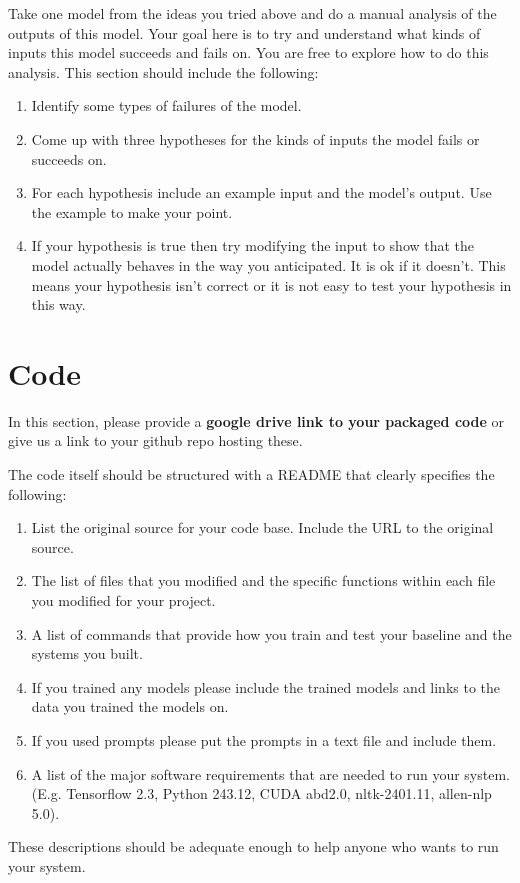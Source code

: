 \documentclass[11pt,a4paper]{article}
\begin{document}
Take one model from the ideas you tried above and do a manual analysis of the outputs of this model. Your goal here is to try and understand what kinds of inputs this model succeeds and fails on. You are free to explore how to do this analysis. This section should include the following:
\begin{enumerate}
\item Identify some types of failures of the model.
\item Come up with three hypotheses for the kinds of inputs the model fails or succeeds on.
\item For each hypothesis include an example input and the model's output. Use the example to make your point.
\item If your hypothesis is true then try modifying the input to show that the model actually behaves in the way you anticipated. It is ok if it doesn't. This means your hypothesis isn't correct or it is not easy to test your hypothesis in this way.
\end{enumerate}

\section{Code}

In this section, please provide a {\bf google drive link to your packaged code} or give us a link to your github repo hosting these.  

The code itself should be structured with a README that clearly specifies the following:
\begin{enumerate}
\item List the original source for your code base. Include the URL to the original source. 
\item The list of files that you modified and the specific functions within each file you modified for your project. 
\item A list of commands that provide how you train and test your baseline and the systems you built.
\item If you trained any models please include the trained models and links to the data you trained the models on.
\item If you used prompts please put the prompts in a text file and include them.
\item A list of the major software requirements that are needed to run your system. (E.g. Tensorflow 2.3, Python 243.12, CUDA abd2.0, nltk-2401.11, allen-nlp 5.0). 
\end{enumerate}
These descriptions should be adequate enough to help anyone who wants to run your system. 
\end{document}
